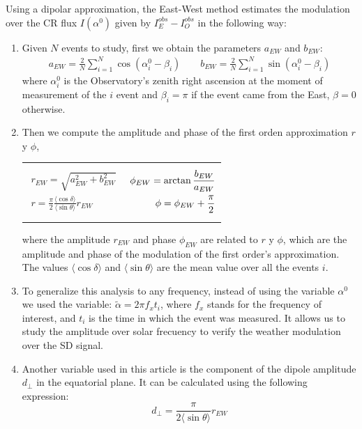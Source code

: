 \documentclass[12pt, doublespace, oneside]{article}
\begin{document}
Using a dipolar approximation, the East-West method estimates the modulation over the CR flux $I(\alpha^0)$ given by $I^{obs}_E -  I^{obs}_O$ in the following way:
\begin{enumerate}
    \item Given $N$ events to study, first we obtain the parameters $a_{EW}$ and $b_{EW}$:
    \begin{align}
        a_{EW} = \frac{2}{N} \sum^N_{i=1}\cos(\alpha^0_i - \beta_i) \qquad
        b_{EW} = \frac{2}{N} \sum^N_{i=1}\sin(\alpha^0_i - \beta_i)
    \end{align}
    where $\alpha^0_i$  is the Observatory's zenith right ascension at the moment of measurement of the $i$ event and $\beta_i=\pi$ if the event came from the East, $\beta=0$ otherwise.  
    \item Then we compute the amplitude and phase of the first orden approximation $r$ y $\phi$,
    \begin{tabular}{@{}p{.4\linewidth}@{}p{.5\linewidth}@{}}
        \begin{align}
            r_{EW} = \sqrt{a_{EW}^2 + b_{EW}^2} \\
            r   =\frac{\pi}{2} \frac{\langle\cos\delta \rangle}{\langle\sin\theta \rangle} r_{EW}\label{dperp} 
        \end{align}
        &    \begin{align}
            \phi_{EW} = \arctangent{\frac{b_{EW}}{a_{EW}}} \\
            \phi = \phi_{EW}+ \frac{\pi}{2} \label{phase_fisico}
        \end{align}
      \end{tabular}
      where the amplitude $r_{EW}$ and phase $\phi_{EW}$ are related to  $r$ y $\phi$, which are the amplitude and phase of the modulation of the first order's approximation. The values $\langle\cos\delta \rangle$ and $\langle\sin\theta \rangle$ are the mean value over all the events $i$.

      \item To generalize this analysis to any frequency, instead of using the variable $\alpha^0$ we used the variable:
      $\tilde{\alpha} = 2\pi f_x t_i $, where $f_x$ stands for the  frequency  of interest, and $t_i$ is the time in which the event was measured. It allows us to study the amplitude over solar frecuency to verify the weather modulation over the SD signal.

      \item Another variable used in this article is the component of the dipole amplitude $d_\perp$ in the equatorial plane. It can be calculated using the following expression:
      \begin{equation}
        d_{\perp} = \frac{\pi}{2\langle\sin\theta \rangle} r_{EW} \label{dperp} 
      \end{equation}
      
\end{enumerate}
\end{document}
